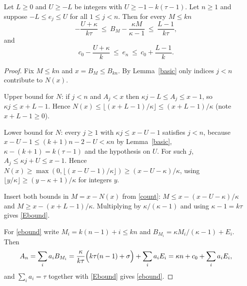 \documentclass[11pt]{article}
\theoremstyle{remark}\newtheorem{remark}[theorem]{Remark}
\theoremstyle{definition}\newtheorem{definition}[theorem]{Definition}
\begin{document}
\begin{proposition}\label{step}
Let \(L\ge0\) and \(U\ge-L\) be integers with \(U\ge-1-k(\tau-1)\). Let \(n\ge1\) and suppose \(-L\le e_j\le U\) for all \(1\le j<n\). Then for every \(M\le kn\)
\begin{equation}\label{Ebound}
-\frac{U+\kappa}{k\tau}\ \le\ B_M-\frac{\kappa M}{\kappa-1}\ \le\ \frac{L-1}{k\tau},
\end{equation}
and
\begin{equation}\label{ebound}
c_0-\frac{U+\kappa}{k}\ \le\ e_n\ \le\ c_0+\frac{L-1}{k}.
\end{equation}
\end{proposition}
\begin{proof}
Fix \(M\le kn\) and \(x=B_M\le B_{kn}\). By Lemma~\ref{basic} only indices \(j<n\) contribute to \(N(x)\).

Upper bound for \(N\): if \(j<n\) and \(A_j<x\) then \(\kappa j-L\le A_j\le x-1\), so \(\kappa j\le x+L-1\). Hence \(N(x)\le\lfloor (x+L-1)/\kappa\rfloor\le (x+L-1)/\kappa\) (note \(x+L-1\ge0\)).

Lower bound for \(N\): every \(j\ge1\) with \(\kappa j\le x-U-1\) satisfies \(j<n\), because \(x-U-1\le (k+1)n-2-U<\kappa n\) by Lemma~\ref{basic}, \(\kappa-(k+1)=k(\tau-1)\) and the hypothesis on \(U\). For such \(j\), \(A_j\le \kappa j+U\le x-1\). Hence \(N(x)\ge\max(0,\lfloor (x-U-1)/\kappa\rfloor)\ge (x-U-\kappa)/\kappa\), using \(\lfloor y/\kappa\rfloor\ge (y-\kappa+1)/\kappa\) for integers \(y\).

Insert both bounds in \(M=x-N(x)\) from \eqref{count}:
\(M\le x-(x-U-\kappa)/\kappa\) and \(M\ge x-(x+L-1)/\kappa\). Multiplying by \(\kappa/(\kappa-1)\) and using \(\kappa-1=k\tau\) gives \eqref{Ebound}.

For \eqref{ebound} write \(M_i=k(n-1)+i\le kn\) and \(B_{M_i}=\kappa M_i/(\kappa-1)+E_i\). Then
\[A_n=\sum_i a_iB_{M_i}=\frac{\kappa}{k\tau}\Bigl(k\tau(n-1)+\sigma\Bigr)+\sum_i a_iE_i=\kappa n+c_0+\sum_ia_iE_i,\]
and \(\sum_i a_i=\tau\) together with \eqref{Ebound} gives \eqref{ebound}.
\end{proof}
\end{document}
